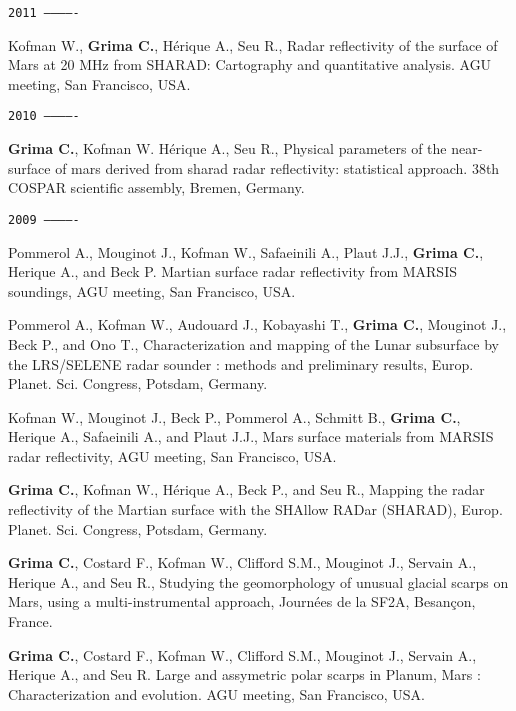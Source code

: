 \begin{etaremune}
\hspace{-2em}\texttt{2011 -------------}

\item
  Kofman W., \textbf{Grima C.}, Hérique A., Seu R., Radar reflectivity
  of the surface of Mars at 20 MHz from SHARAD: Cartography and
  quantitative analysis. AGU meeting, San Francisco, USA.

\hspace{-2em}\texttt{2010 -------------}

\item
  \textbf{Grima C.}, Kofman W. Hérique A., Seu R., Physical parameters
  of the near-surface of mars derived from sharad radar reflectivity:
  statistical approach. 38th COSPAR scientific assembly, Bremen,
  Germany.

\hspace{-2em}\texttt{2009 -------------}

\item
  Pommerol A., Mouginot J., Kofman W., Safaeinili A., Plaut J.J.,
  \textbf{Grima C.}, Herique A., and Beck P. Martian surface radar
  reflectivity from MARSIS soundings, AGU meeting, San Francisco, USA.
\item
  Pommerol A., Kofman W., Audouard J., Kobayashi T., \textbf{Grima C.},
  Mouginot J., Beck P., and Ono T., Characterization and mapping of the
  Lunar subsurface by the LRS/SELENE radar sounder : methods and
  preliminary results, Europ. Planet. Sci. Congress, Potsdam, Germany.
\item
  Kofman W., Mouginot J., Beck P., Pommerol A., Schmitt B.,
  \textbf{Grima C.}, Herique A., Safaeinili A., and Plaut J.J., Mars
  surface materials from MARSIS radar reflectivity, AGU meeting, San
  Francisco, USA.
\item
  \textbf{Grima C.}, Kofman W., Hérique A., Beck P., and Seu R., Mapping
  the radar reflectivity of the Martian surface with the SHAllow RADar
  (SHARAD), Europ. Planet. Sci. Congress, Potsdam, Germany.
\item
  \textbf{Grima C.}, Costard F., Kofman W., Clifford S.M., Mouginot J.,
  Servain A., Herique A., and Seu R., Studying the geomorphology of
  unusual glacial scarps on Mars, using a multi-instrumental approach,
  Journées de la SF2A, Besançon, France.
\item
  \textbf{Grima C.}, Costard F., Kofman W., Clifford S.M., Mouginot J.,
  Servain A., Herique A., and Seu R. Large and assymetric polar scarps
  in Planum, Mars : Characterization and evolution. AGU meeting, San
  Francisco, USA.


\end{etaremune}
